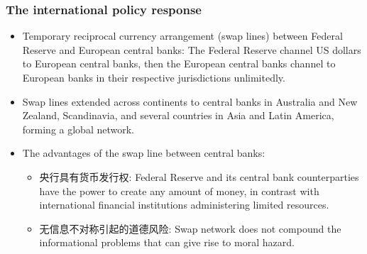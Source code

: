\subsubsection{The international policy response}
\begin{itemize}
\item Temporary reciprocal currency arrangement (swap lines) between Federal Reserve and European central banks: The Federal Reserve channel US dollars to European central banks, then the European central banks channel to European banks in their respective jurisdictions unlimitedly.
\item Swap lines extended across continents to central banks in Australia and New Zealand, Scandinavia, and several countries in Asia and Latin America, forming a global network.
\item The advantages of the swap line between central banks:
  \begin{itemize}
  \item 央行具有货币发行权: Federal Reserve and its central bank counterparties have the power to create any amount of money, in contrast with international financial institutions administering limited resources.
  \item 无信息不对称引起的道德风险: Swap network does not compound the informational problems that can give rise to moral hazard.
  \end{itemize}
\end{itemize}


